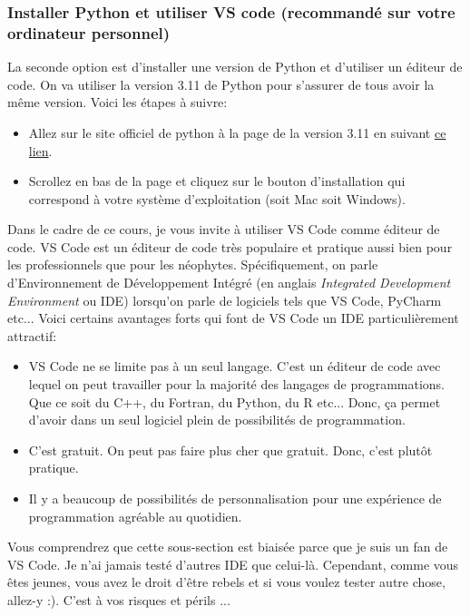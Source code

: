 \documentclass[titlepage]{article}
\theoremstyle{cleanremark}
\begin{document}
\subsubsection{Installer Python et utiliser VS code (recommandé sur votre ordinateur personnel)}

La seconde option est d'installer une version de Python et d'utiliser un éditeur de code. On va utiliser la version 3.11 de Python pour s'assurer de tous avoir la même version. Voici les étapes à suivre:
\begin{itemize}
    \item Allez sur le site officiel de python à la page de la version 3.11 en suivant \href{https://www.python.org/downloads/release/python-3119/}{ce lien}.
    \item Scrollez en bas de la page et cliquez sur le bouton d'installation qui correspond à votre système d'exploitation (soit Mac soit Windows). 
\end{itemize}


Dans le cadre de ce cours, je vous invite à utiliser VS Code comme éditeur de code. VS Code est un éditeur de code très populaire et pratique aussi bien pour les professionnels que pour les néophytes. Spécifiquement, on parle d'Environnement de Développement Intégré (en anglais \textit{Integrated Development Environment} ou IDE) lorsqu'on parle de logiciels tels que VS Code, PyCharm etc... Voici certains avantages forts qui font de VS Code un IDE particulièrement attractif:

\begin{itemize}[label=]
    \item VS Code ne se limite pas à un seul langage. C'est un éditeur de code avec lequel on peut travailler pour la majorité des langages de programmations. Que ce soit du C++, du Fortran, du Python, du R etc... Donc, ça permet d'avoir dans un seul logiciel plein de possibilités de programmation. 
    \item C'est gratuit. On peut pas faire plus cher que gratuit. Donc, c'est plutôt pratique.
    \item Il y a beaucoup de possibilités de personnalisation pour une expérience de programmation agréable au quotidien. 
\end{itemize}

Vous comprendrez que cette sous-section est biaisée parce que je suis un fan de VS Code. Je n'ai jamais testé d'autres IDE que celui-là. Cependant, comme vous êtes jeunes, vous avez le droit d'être rebels et si vous voulez tester autre chose, allez-y :). 
C'est à vos risques et périls ...
\end{document}
